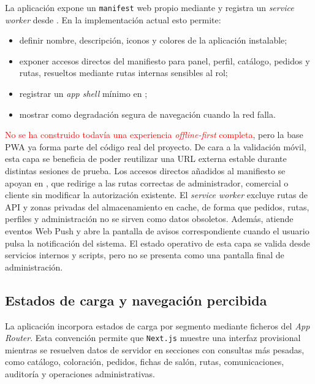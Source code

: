 La aplicación expone un \texttt{manifest} web propio mediante  y registra un \textit{service worker} desde . En la implementación actual esto permite:

\begin{itemize}
    \item definir nombre, descripción, iconos y colores de la aplicación instalable;
    \item exponer accesos directos del manifiesto para panel, perfil, catálogo, pedidos y rutas, resueltos mediante rutas internas sensibles al rol;
    \item registrar un \textit{app shell} mínimo en ;
    \item mostrar  como degradación segura de navegación cuando la red falla.
\end{itemize}

\textcolor{red}{No se ha construido todavía una experiencia \textit{offline-first} completa}, pero la base PWA ya forma parte del código real del proyecto. De cara a la validación móvil, esta capa se beneficia de poder reutilizar una URL externa estable durante distintas sesiones de prueba. Los accesos directos añadidos al manifiesto se apoyan en , que redirige a las rutas correctas de administrador, comercial o cliente sin modificar la autorización existente. El \textit{service worker} excluye rutas de API y zonas privadas del almacenamiento en cache, de forma que pedidos, rutas, perfiles y administración no se sirven como datos obsoletos. Además, atiende eventos Web Push y abre la pantalla de avisos correspondiente cuando el usuario pulsa la notificación del sistema. El estado operativo de esta capa se valida desde servicios internos y scripts, pero no se presenta como una pantalla final de administración.

\subsection{Estados de carga y navegación percibida}

La aplicación incorpora estados de carga por segmento mediante ficheros  del \textit{App Router}. Esta convención permite que \texttt{Next.js} muestre una interfaz provisional mientras se resuelven datos de servidor en secciones con consultas más pesadas, como catálogo, coloración, pedidos, fichas de salón, rutas, comunicaciones, auditoría y operaciones administrativas.

